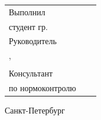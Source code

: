 \vspace{4mm plus2fill}%

\noindent
\begin{tabularx}{\linewidth}{lXl}
	Выполнил              &	   &             \\
	студент гр.~\group{}  &    & \Author{}    \\[\mfloatsep]

	Руководитель 		  &    &             \\
	\SupervisorJob,		  &    &             \\
	\SupervisorDegree\SupervisorTitle 	  &    & \Supervisor{} \\[\mfloatsep]


	Консультант  &    &  \\
	по нормоконтролю  		 	  &    & \ConsultantNorm{}  %
\end{tabularx} %


%
\vspace{0pt plus4fill}%


\begin{center}%
Санкт-Петербург\\
\thesisYear{}
\end{center}%
\restoregeometry{}
\newpage{}
